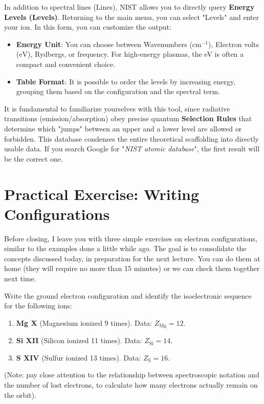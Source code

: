 In addition to spectral lines (Lines), NIST allows you to directly query \textbf{Energy Levels (Levels)}.
Returning to the main menu, you can select "Levels" and enter your ion. In this form, you can customize the output:
\begin{itemize}
\item \textbf{Energy Unit}: You can choose between Wavenumbers ($\text{cm}^{-1}$), Electron volts ($\text{eV}$), Rydbergs, or frequency. For high-energy plasmas, the eV is often a compact and convenient choice.
\item \textbf{Table Format}: It is possible to order the levels by increasing energy, grouping them based on the configuration and the spectral term.
\end{itemize}

It is fundamental to familiarize yourselves with this tool, since radiative transitions (emission/absorption) obey precise quantum \textbf{Selection Rules} that determine which "jumps" between an upper and a lower level are allowed or forbidden. This database condenses the entire theoretical scaffolding into directly usable data. If you search Google for "\textit{NIST atomic database}", the first result will be the correct one.

\section{Practical Exercise: Writing Configurations}

Before closing, I leave you with three simple exercises on electron configurations, similar to the examples done a little while ago. The goal is to consolidate the concepts discussed today, in preparation for the next lecture. You can do them at home (they will require no more than 15 minutes) or we can check them together next time.

Write the ground electron configuration and identify the isoelectronic sequence for the following ions:
\begin{enumerate}
\item \textbf{Mg X} (Magnesium ionized 9 times). Data: $Z_{\text{Mg}} = 12$.
\item \textbf{Si XII} (Silicon ionized 11 times). Data: $Z_{\text{Si}} = 14$.
\item \textbf{S XIV} (Sulfur ionized 13 times). Data: $Z_{\text{S}} = 16$.
\end{enumerate}

(Note: pay close attention to the relationship between spectroscopic notation and the number of lost electrons, to calculate how many electrons actually remain on the orbit).

